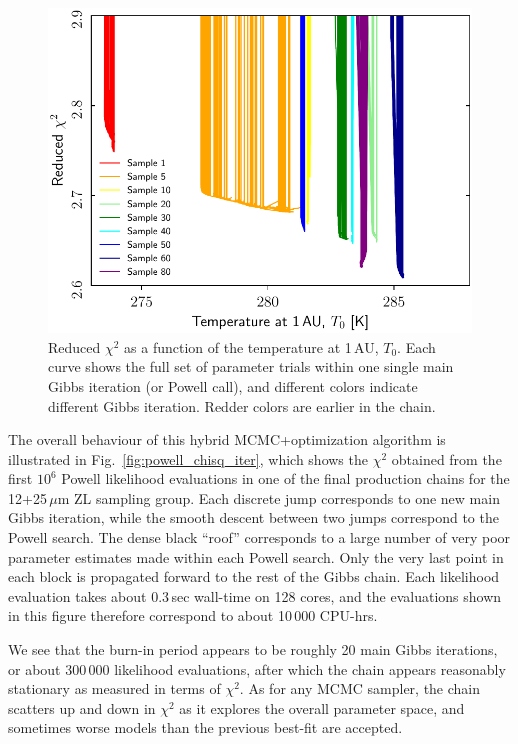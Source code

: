 \documentclass[twocolumn]{aa}
\begin{document}
\begin{figure}[t]
    \centering
    \includegraphics[width=\linewidth]{figs/powell_T0_vs_chisq.pdf}
    \caption{Reduced $\chi^2$ as a function of the temperature at 1\,AU, $T_0$. Each curve shows the full set of parameter trials within one single main Gibbs iteration (or Powell call), and different colors indicate different Gibbs iteration. Redder colors are earlier in the chain.}
    \label{fig:powell_T0}
\end{figure}

The overall behaviour of this hybrid MCMC+optimization algorithm is
illustrated in Fig.~\ref{fig:powell_chisq_iter}, which shows the
$\chi^2$ obtained from the first $10^6$ Powell likelihood evaluations
in one of the final production chains for the 12+25\,$\mu$m ZL
sampling group. Each discrete jump corresponds to one new main Gibbs
iteration, while the smooth descent between two jumps correspond to
the Powell search. The dense black ``roof'' corresponds to a large
number of very poor parameter estimates made within each Powell
search. Only the very last point in each block is propagated forward
to the rest of the Gibbs chain. Each likelihood evaluation takes about
0.3\,sec wall-time on 128 cores, and the evaluations shown in this
figure therefore correspond to about 10\,000 CPU-hrs.

We see that the burn-in period appears to be roughly 20 main Gibbs
iterations, or about 300\,000 likelihood evaluations, after which the
chain appears reasonably stationary as measured in terms of
$\chi^2$. As for any MCMC sampler, the chain scatters up and down in
$\chi^2$ as it explores the overall parameter space, and sometimes
worse models than the previous best-fit are accepted.
\end{document}
